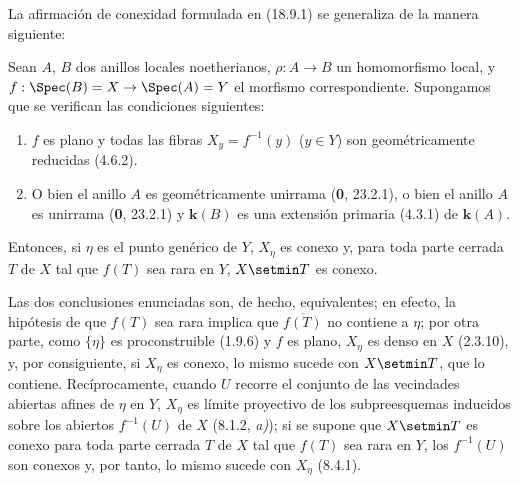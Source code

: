 La afirmación de conexidad formulada en (18.9.1) se generaliza de la manera siguiente:

\begin{theorem}[18.9.7]
\label{IV.18.9.7}
Sean $A$, $B$ dos anillos locales noetherianos, $\rho:A\to B$ un homomorfismo local, y $f:\Spec(B)=X\to\Spec(A)=Y$ el morfismo correspondiente. Supongamos que se verifican las condiciones siguientes:
\begin{enumerate}
  \item[\textup{(i)}] $f$ es plano y todas las fibras $X_y=f^{-1}(y)$ \textup{(}$y\in Y$\textup{)} son geométricamente reducidas \textup{(4.6.2)}.
  \item[\textup{(ii)}] \textup{O bien} el anillo $A$ es geométricamente unirrama \textup{(\textbf 0, 23.2.1), o bien} el anillo $A$ es unirrama \textup{(\textbf 0, 23.2.1)} y $\boldsymbol{k}(B)$ es una extensión primaria \textup{(4.3.1)} de $\boldsymbol{k}(A)$.
\end{enumerate}
Entonces, si $\eta$ es el punto genérico de $Y$, $X_\eta$ es conexo y, para toda parte cerrada $T$ de $X$ tal que $f(T)$ sea rara en $Y$, $X\setmin T$ es conexo.
\end{theorem}

Las dos conclusiones enunciadas son, de hecho, equivalentes; en efecto, la hipótesis de que $f(T)$ sea rara implica que $\overline{f(T)}$ no contiene a $\eta$; por otra parte, como $\{\eta\}$ es proconstruible (1.9.6) y $f$ es plano, $X_\eta$ es denso en $X$ (2.3.10), y, por consiguiente, si $X_\eta$ es conexo, lo mismo sucede con $X\setmin T$, que lo contiene. Recíprocamente, cuando $U$ recorre el conjunto de las vecindades abiertas afines de $\eta$ en $Y$, $X_\eta$ es límite proyectivo de los subpreesquemas inducidos sobre los abiertos $f^{-1}(U)$ de $X$ (8.1.2, \emph{a)}); si se supone que $X\setmin T$ es conexo para toda parte cerrada $T$ de $X$ tal que $f(T)$ sea rara en $Y$, los $f^{-1}(U)$ son conexos y, por tanto, lo mismo sucede con $X_\eta$ (8.4.1).

